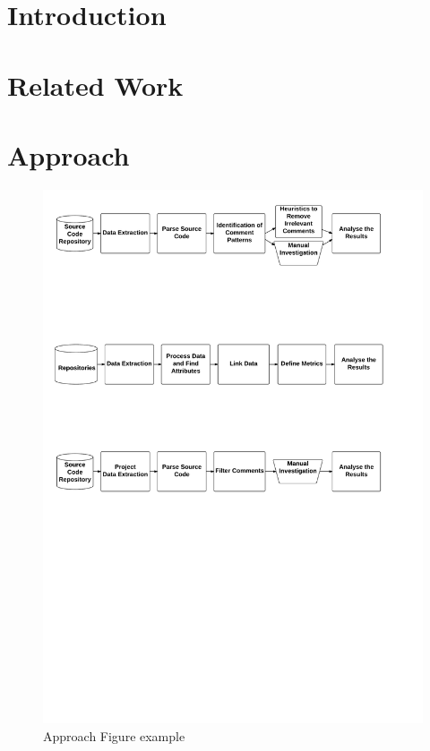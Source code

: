 
\section{Introduction}
\label{chap3:sec:introduction}


\section{Related Work}
\label{chap3:sec:related_work}

\section{Approach}
\label{chap3:sec:approach}

\begin{figure}[thb!]
  \centering
  \includegraphics[width=1\textwidth]{figures/chapter3/approach.pdf}
  \caption{Approach Figure example}
  \label{chap3:fig:approach}
\end{figure}

